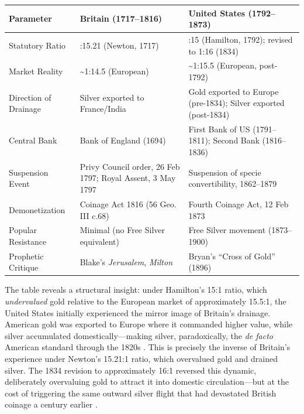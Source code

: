\documentclass[
]{article}
\newcounter{none} %
\begin{document}
{\def\LTcaptype{none} %
\begin{longtable}[]{@{}
  >{\raggedright\arraybackslash}p{}
  >{\raggedright\arraybackslash}p{}
  >{\raggedright\arraybackslash}p{}@{}}
\toprule\noalign{}
\begin{minipage}[b]{\linewidth}\raggedright
Parameter
\end{minipage} & \begin{minipage}[b]{\linewidth}\raggedright
Britain (1717--1816)
\end{minipage} & \begin{minipage}[b]{\linewidth}\raggedright
United States (1792--1873)
\end{minipage} \\
\midrule\noalign{}
\endhead
\bottomrule\noalign{}
\endlastfoot
Statutory Ratio & 1:15.21 (Newton, 1717) & 1:15 (Hamilton, 1792);
revised to 1:16 (1834) \\
Market Reality & \textasciitilde1:14.5 (European) &
\textasciitilde1:15.5 (European, post-1792) \\
Direction of Drainage & Silver exported to France/India & Gold exported
to Europe (pre-1834); Silver exported (post-1834) \\
Central Bank & Bank of England (1694) & First Bank of US (1791--1811);
Second Bank (1816--1836) \\
Suspension Event & Privy Council order, 26 Feb 1797; Royal Assent, 3 May
1797 & Suspension of specie convertibility, 1862--1879 \\
Demonetization & Coinage Act 1816 (56 Geo. III c.68) & Fourth Coinage
Act, 12 Feb 1873 \\
Popular Resistance & Minimal (no Free Silver equivalent) & Free Silver
movement (1873--1900) \\
Prophetic Critique & Blake's \emph{Jerusalem}, \emph{Milton} & Bryan's
``Cross of Gold'' (1896) \\
\end{longtable}
}

The table reveals a structural insight: under Hamilton's 15:1 ratio,
which \emph{undervalued} gold relative to the European market of
approximately 15.5:1, the United States initially experienced the mirror
image of Britain's drainage. American gold was exported to Europe where
it commanded higher value, while silver accumulated
domestically---making silver, paradoxically, the \emph{de facto}
American standard through the 1820s
\citep{laughlin1898bimetallism, officer2001bimetallism}. This is
precisely the inverse of Britain's experience under Newton's 15.21:1
ratio, which overvalued gold and drained silver. The 1834 revision to
approximately 16:1 reversed this dynamic, deliberately overvaluing gold
to attract it into domestic circulation---but at the cost of triggering
the same outward silver flight that had devastated British coinage a
century earlier \citep{redish1990evolution}.
\end{document}
